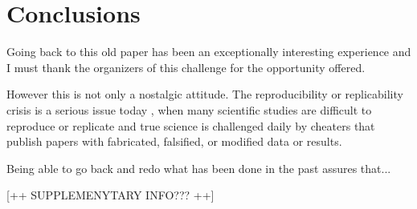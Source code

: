\section{Conclusions}

Going back to this old paper has been an exceptionally interesting experience and I must thank the organizers of this challenge for the opportunity offered.

However this is not only a nostalgic attitude. The reproducibility or replicability crisis is a serious issue today \cite{Miyakawa:2020}, when many scientific studies are difficult to reproduce or replicate and  true science is challenged daily by cheaters that publish papers with fabricated, falsified, or modified data or results.

Being able to go back and redo what has been done in the past assures that...

[++ SUPPLEMENYTARY INFO??? ++]



%
%






